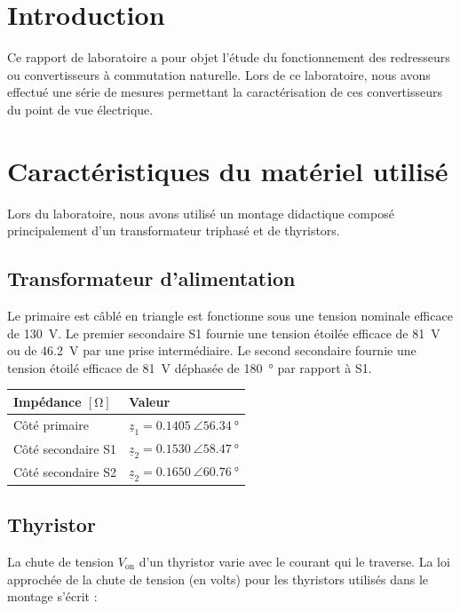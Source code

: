 \documentclass[a4paper, 11pt, openany, oneside, french]{article}
\newcommand\blankpage{%
    \null
    \thispagestyle{empty}%
    \addtocounter{page}{-1}%
    \newpage}
\begin{document}
\umonsCoverPage



{}
\section*{Introduction}

Ce rapport de laboratoire a pour objet l'étude du fonctionnement des redresseurs ou convertisseurs à commutation naturelle. Lors de ce laboratoire, nous avons effectué une série de mesures permettant la caractérisation de ces convertisseurs du point de vue électrique.\\

\section{Caractéristiques du matériel utilisé}
Lors du laboratoire, nous avons utilisé un montage didactique composé principalement d'un transformateur triphasé et de thyristors.

\subsection{Transformateur d'alimentation}
Le primaire est câblé en triangle est fonctionne sous une tension nominale efficace de \SI{130}{\volt}. Le premier secondaire S1 fournie une tension étoilée efficace de \SI{81}{\volt} ou de \SI{46,2}{\volt} par une prise intermédiaire. Le second secondaire fournie une tension étoilé efficace de \SI{81}{\volt} déphasée de \SI{180}{\degree} par rapport à S1.
\begin{table}[!ht]
\centering
\begin{tabular}{ll}
\toprule
Impédance $\left[\si{\ohm}\right]$ & Valeur\\
\midrule
Côté primaire & $\underline{z}_1 = \SI{0,1405}{\angle} \SI{56,34}{\degree}$\\
Côté secondaire S1 & $\underline{z}_2 = \SI{0,1530}{\angle} \SI{58,47}{\degree}$\\
Côté secondaire S2 & $\underline{z}_2 = \SI{0,1650}{\angle} \SI{60,76}{\degree}$\\
\bottomrule
\end{tabular}
\end{table}

\subsection{Thyristor}
La chute de tension $V_{\text{on}}$ d'un thyristor varie avec le courant qui le traverse. La loi approchée de la chute de tension (en volts) pour les thyristors utilisés dans le montage s’écrit :\\
\end{document}
